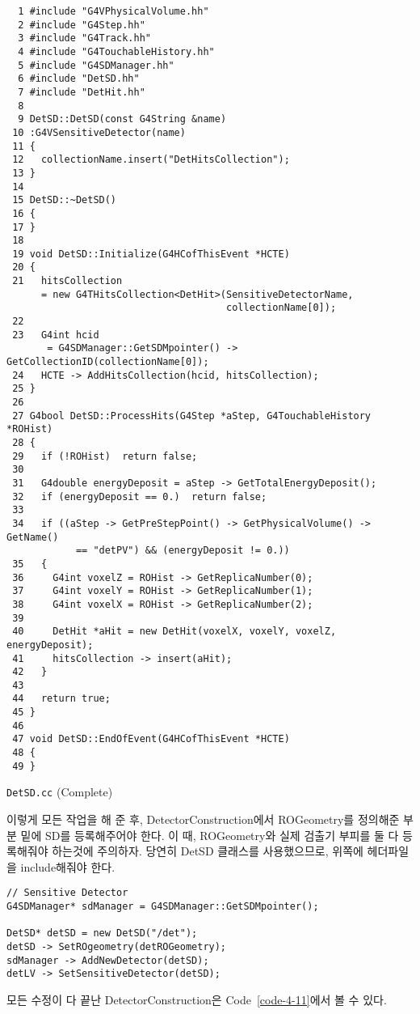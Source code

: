 \begin{code}[p]
\begin{lstlisting}
  1 #include "G4VPhysicalVolume.hh"
  2 #include "G4Step.hh"
  3 #include "G4Track.hh"
  4 #include "G4TouchableHistory.hh"
  5 #include "G4SDManager.hh"
  6 #include "DetSD.hh"
  7 #include "DetHit.hh"
  8 
  9 DetSD::DetSD(const G4String &name)
 10 :G4VSensitiveDetector(name)
 11 {
 12   collectionName.insert("DetHitsCollection");
 13 }
 14 
 15 DetSD::~DetSD()
 16 {
 17 }
 18 
 19 void DetSD::Initialize(G4HCofThisEvent *HCTE)
 20 {
 21   hitsCollection
      = new G4THitsCollection<DetHit>(SensitiveDetectorName,
                                      collectionName[0]);
 22 
 23   G4int hcid
       = G4SDManager::GetSDMpointer() -> GetCollectionID(collectionName[0]);
 24   HCTE -> AddHitsCollection(hcid, hitsCollection);
 25 }
 26 
 27 G4bool DetSD::ProcessHits(G4Step *aStep, G4TouchableHistory *ROHist)
 28 {
 29   if (!ROHist)  return false;
 30 
 31   G4double energyDeposit = aStep -> GetTotalEnergyDeposit();
 32   if (energyDeposit == 0.)  return false;
 33 
 34   if ((aStep -> GetPreStepPoint() -> GetPhysicalVolume() -> GetName()
            == "detPV") && (energyDeposit != 0.))
 35   {
 36     G4int voxelZ = ROHist -> GetReplicaNumber(0);
 37     G4int voxelY = ROHist -> GetReplicaNumber(1);
 38     G4int voxelX = ROHist -> GetReplicaNumber(2);
 39 
 40     DetHit *aHit = new DetHit(voxelX, voxelY, voxelZ, energyDeposit);
 41     hitsCollection -> insert(aHit);
 42   }
 43 
 44   return true;
 45 }
 46 
 47 void DetSD::EndOfEvent(G4HCofThisEvent *HCTE)
 48 {
 49 }
\end{lstlisting}
\caption{\texttt{DetSD.cc} (Complete) \label{code-4-9}}
\end{code}

이렇게 모든 작업을 해 준 후, DetectorConstruction에서 ROGeometry를 정의해준
부분 밑에 SD를 등록해주어야 한다. 이 때, ROGeometry와 실제 검출기 부피를 둘 다
등록해줘야 하는것에 주의하자. 당연히 DetSD 클래스를 사용했으므로, 위쪽에
헤더파일을 include해줘야 한다.
\begin{pc}
\begin{lstlisting}
// Sensitive Detector
G4SDManager* sdManager = G4SDManager::GetSDMpointer();

DetSD* detSD = new DetSD("/det");
detSD -> SetROgeometry(detROGeometry);
sdManager -> AddNewDetector(detSD);
detLV -> SetSensitiveDetector(detSD);
\end{lstlisting}
\end{pc}

모든 수정이 다 끝난 DetectorConstruction은 Code~\ref{code-4-11}에서 볼 수 있다.

